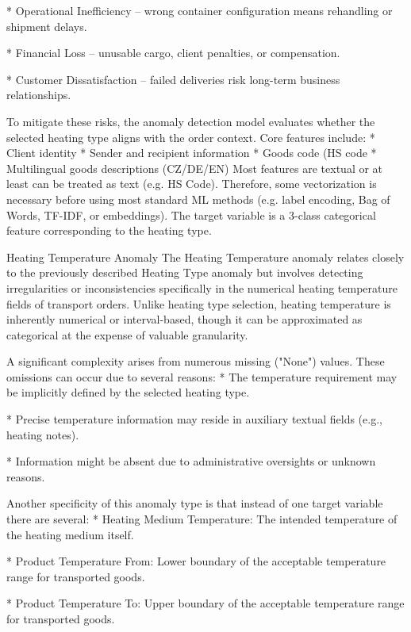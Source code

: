 * Operational Inefficiency – wrong container configuration means rehandling or shipment delays.

* Financial Loss – unusable cargo, client penalties, or compensation.

* Customer Dissatisfaction – failed deliveries risk long-term business relationships.
\enditems

To mitigate these risks, the anomaly detection model evaluates whether the selected heating type aligns with the order context. Core features include:
\begitems
* Client identity
* Sender and recipient information
* Goods code (HS code
* Multilingual goods descriptions (CZ/DE/EN)
\enditems
Most features are textual or at least can be treated as text (e.g. HS Code). Therefore, some vectorization is necessary before using most standard ML methods (e.g. label encoding, Bag of Words, TF-IDF, or embeddings). The target variable is a 3-class categorical feature corresponding to the heating type.

\sec Heating Temperature Anomaly
The Heating Temperature anomaly relates closely to the previously described Heating Type anomaly but involves detecting irregularities or inconsistencies specifically in the numerical heating temperature fields of transport orders. Unlike heating type selection, heating temperature is inherently numerical or interval-based, though it can be approximated as categorical at the expense of valuable granularity.

A significant complexity arises from numerous missing ("None") values. These omissions can occur due to several reasons:
\begitems
* The temperature requirement may be implicitly defined by the selected heating type.

* Precise temperature information may reside in auxiliary textual fields (e.g., heating notes).

* Information might be absent due to administrative oversights or unknown reasons.
\enditems

Another specificity of this anomaly type is that instead of one target variable there are several:
\begitems
* Heating Medium Temperature: The intended temperature of the heating medium itself.

* Product Temperature From: Lower boundary of the acceptable temperature range for transported goods.

* Product Temperature To: Upper boundary of the acceptable temperature range for transported goods.
\enditems

